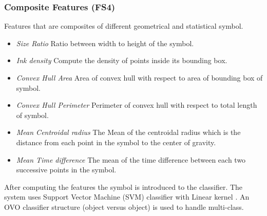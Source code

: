 \documentclass{article}
\begin{document}
\subsubsection{Composite Features (FS4)}
 Features that are composites of different geometrical and statistical symbol. 
	\begin{itemize}
\item \emph{Size Ratio} Ratio between width to height of the symbol.
	\item \emph{Ink density} Compute the density of points inside its bounding box\cite{GeometryAndDomain102}.   
 	\item \emph{Convex Hull Area} Area of convex hull with respect to area of bounding box of symbol.
	\item \emph{Convex Hull Perimeter} Perimeter of convex hull with respect to total length of symbol.
		\item \emph{Mean Centroidal radius} The Mean of the centroidal radius which is the distance from each point in the symbol to the center of gravity.
	
	\item \emph{Mean Time difference} The mean of the time difference between each two successive points in the symbol. %
  \end{itemize}
  
  
After computing the features the symbol is introduced to the classifier. The system uses Support Vector Machine (SVM) classifier with Linear kernel \cite{libsvm}. An OVO classifier structure (object versus object) is used to handle multi-class.%
\end{document}
